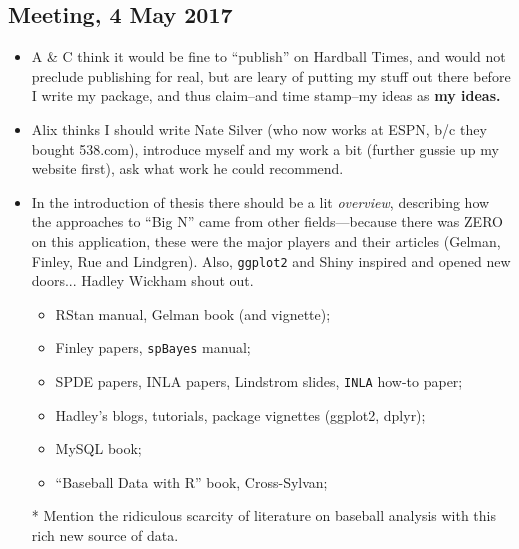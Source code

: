 \documentclass{article}
\begin{document}
\subsection*{Meeting, 4 May 2017}
\begin{itemize}
\item A \& C think it would be fine to ``publish'' on Hardball Times, and would not preclude publishing for real, but are leary of putting my stuff out there before I write my package, and thus claim--and time stamp--my ideas as {\bf my ideas.}
\item Alix thinks I should write Nate Silver (who now works at ESPN, b/c they bought 538.com), introduce myself and my work a bit (further gussie up my website first), ask what work he could recommend.
\item In the introduction of thesis there should be a lit {\it overview}, describing how the approaches to ``Big N'' came from other fields---because there was ZERO on this application, these were the major players and their articles (Gelman, Finley, Rue and Lindgren). Also, \verb|ggplot2| and Shiny inspired and opened new doors... Hadley Wickham shout out.
  \begin{itemize}
  \item RStan manual, Gelman book (and vignette); 
  \item Finley papers, \verb|spBayes| manual; 
  \item SPDE papers, INLA papers, Lindstrom slides, \verb|INLA| how-to paper; 
  \item Hadley's blogs, tutorials, package vignettes (ggplot2, dplyr); 
  \item MySQL book; 
  \item ``Baseball Data with R'' book, Cross-Sylvan;
  \end{itemize}
* Mention the ridiculous scarcity of literature on baseball analysis with this rich new source of data.


\end{itemize}
\end{document}
